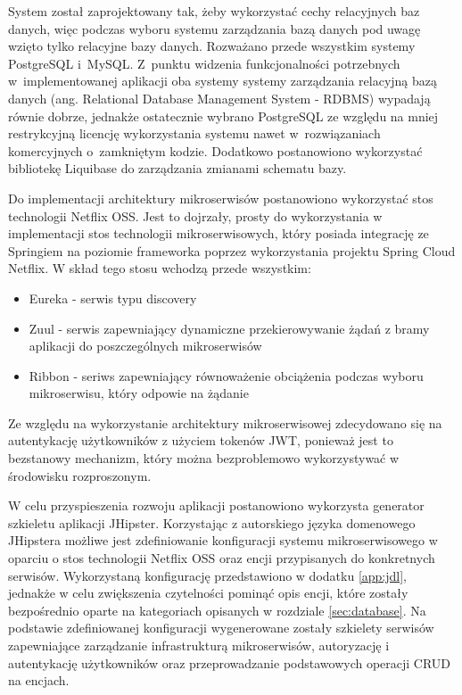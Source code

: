 \par
System został zaprojektowany tak, żeby wykorzystać cechy relacyjnych baz danych,
więc podczas wyboru systemu zarządzania bazą danych pod uwagę wzięto tylko relacyjne bazy danych.
Rozważano przede wszystkim systemy PostgreSQL\cite{tech:postgresql} i~MySQL\cite{tech:mysql}.
Z~punktu widzenia funkcjonalności potrzebnych w~implementowanej aplikacji oba systemy systemy zarządzania relacyjną bazą danych (ang. Relational Database Management System - RDBMS) wypadają równie dobrze,
jednakże ostatecznie wybrano PostgreSQL ze względu na mniej restrykcyjną licencję wykorzystania systemu nawet w~rozwiązaniach komercyjnych o~zamkniętym kodzie.
Dodatkowo postanowiono wykorzystać bibliotekę Liquibase\cite{tech:liquibase} do zarządzania zmianami schematu bazy.

\par
Do implementacji architektury mikroserwisów postanowiono wykorzystać stos technologii Netflix OSS\cite{tech:netflix-oss}.
Jest to dojrzały, prosty do wykorzystania w implementacji stos technologii mikroserwisowych,
który posiada integrację ze Springiem na poziomie frameworka poprzez wykorzystania projektu Spring Cloud Netflix\cite{tech:spring-cloud-netflix}.
W skład tego stosu wchodzą przede wszystkim:
\begin{itemize}
    \item Eureka\cite{tech:netflix-eureka} - serwis typu discovery
    \item Zuul\cite{tech:netflix-zuul} - serwis zapewniający dynamiczne przekierowywanie żądań z bramy aplikacji do poszczególnych mikroserwisów
    \item Ribbon\cite{tech:netflix-ribbon} - seriws zapewniający równoważenie obciążenia podczas wyboru mikroserwisu, który odpowie na żądanie
\end{itemize}

\par
Ze względu na wykorzystanie architektury mikroserwisowej zdecydowano się na autentykację użytkowników z użyciem tokenów JWT\cite{url:jwt},
ponieważ jest to bezstanowy mechanizm, który można bezproblemowo wykorzystywać w środowisku rozproszonym.

\par
W celu przyspieszenia rozwoju aplikacji postanowiono wykorzysta generator szkieletu aplikacji JHipster\cite{tech:jhipster}.
Korzystając z autorskiego języka domenowego JHipstera możliwe jest zdefiniowanie konfiguracji systemu mikroserwisowego w oparciu o stos technologii Netflix OSS oraz encji przypisanych do konkretnych serwisów.
Wykorzystaną konfigurację przedstawiono w dodatku \ref{app:jdl}, jednakże w celu zwiększenia czytelności pominąć opis encji, które zostały bezpośrednio oparte na kategoriach opisanych w rozdziale \ref{sec:database}.
Na podstawie zdefiniowanej konfiguracji wygenerowane zostały szkielety serwisów zapewniające zarządzanie infrastrukturą mikroserwisów, autoryzację i autentykację użytkowników oraz przeprowadzanie podstawowych operacji CRUD na encjach.


